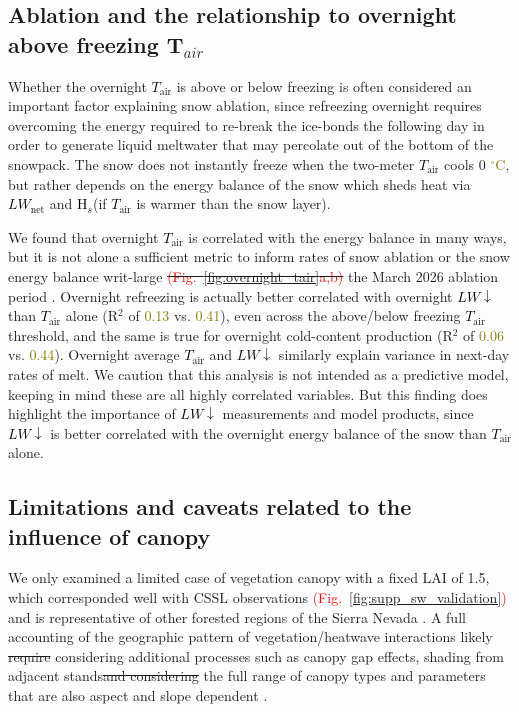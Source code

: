\documentclass[draft]{agujournal2019}
\newcommand{\fig}[2]{\textcolor{red}{(Fig.~\ref{#1}{#2})}}   %
\newcommand{\mynum}[1]{\textcolor{olive}{#1}}
\newcommand{\tair}{\textcolor{black}{$T_{\mathrm{air}}$}\xspace}
\newcommand{\lwnet}{\textcolor{black}{$LW_{\mathrm{net}}$}\xspace}
\newcommand{\lwdn}{\textcolor{black}{$LW\downarrow$}\xspace}
\newcommand{\hs}{\textcolor{black}{H$_s$}\xspace}
\newcommand{\degrc}{\textcolor{olive}{$^\circ$C}\xspace}
\providecommand{\DIFadd}[1]{{\protect\color{blue}\uwave{#1}}} %
\providecommand{\DIFdel}[1]{{\protect\color{red}\sout{#1}}}                      %
\providecommand{\DIFaddbegin}{} %
\providecommand{\DIFaddend}{} %
\providecommand{\DIFdelbegin}{} %
\providecommand{\DIFdelend}{} %
\begin{document}
\subsection{Ablation and the relationship to overnight above freezing T$_{air}$} 
Whether the overnight \tair is above or below freezing is often considered an important factor explaining snow ablation, since refreezing overnight requires overcoming the energy required to re-break the ice-bonds the following day in order to generate liquid meltwater that may percolate out of the bottom of the snowpack.
The snow does not instantly freeze when the two-meter \tair cools \DIFaddbegin \DIFadd{to }\DIFaddend 0 \degrc, but rather depends on the energy balance of the snow which sheds heat via \lwnet and \hs (if \tair is warmer than the snow layer).

We found that overnight \tair is correlated with the energy balance in many ways, but it is not alone a sufficient metric to inform rates of snow ablation or the snow energy balance writ-large \DIFdelbegin \DIFdel{\fig{fig:overnight_tair}{a,b} }\DIFdelend \DIFaddbegin \DIFadd{during }\DIFaddend the March 2026 ablation period \DIFaddbegin \DIFadd{\fig{fig:overnight_tair}{a,b}}\DIFaddend .
Overnight refreezing is actually better correlated with overnight \lwdn than \tair alone (R$^2$ of \mynum{0.13} vs. \mynum{0.41}), even across the above/below freezing \tair threshold, and the same is true for overnight cold-content production (R$^2$ of \mynum{0.06} vs. \mynum{0.44}). 
Overnight average \tair and \lwdn similarly explain variance in next-day rates of melt.
We caution that this analysis is not intended as a predictive model, keeping in mind these are all highly correlated variables.
But this finding does highlight the importance of \lwdn measurements and model products, since \lwdn is better correlated with the overnight energy balance of the snow than \tair alone.



\subsection{Limitations and caveats related to the influence of canopy} 
We only examined a limited case of vegetation canopy with a fixed LAI of 1.5, which corresponded well with CSSL observations \fig{fig:supp_sw_validation}{} and is representative of other forested regions of the Sierra Nevada \cite{VanGunst2012, Krogh2020-dh}.
A full accounting of the geographic pattern of vegetation/heatwave interactions likely \DIFdelbegin \DIFdel{require }\DIFdelend \DIFaddbegin \DIFadd{requires }\DIFaddend considering additional processes such as canopy gap effects, shading from adjacent stands\DIFdelbegin \DIFdel{and considering }\DIFdelend \DIFaddbegin \DIFadd{, and }\DIFaddend the full range of canopy types and parameters that are also aspect and slope dependent \cite{Broxton2015-wh}.
\end{document}
